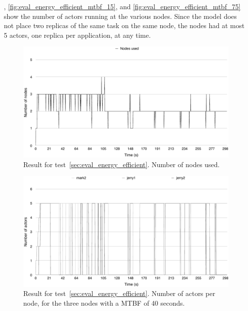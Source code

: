 \documentclass{cslthse-msc}
\begin{document}
, \cref{fig:eval_energy_efficient_mtbf_15}, and \cref{fig:eval_energy_efficient_mtbf_75} show the number of actors running at the various nodes. Since the model does not place two replicas of the same task on the same node, the nodes had at most 5 actors, one replica per application, at any time.

\begin{figure}[!hbt]
\centering
\includegraphics[scale=0.5]{images/results/energy_efficient/total.pdf}
\caption{Result for test~\ref{sec:eval_energy_efficient}. Number of nodes used.} \label{fig:eval_energy_efficient_total}
\end{figure}

\begin{figure}[!hbt]
\centering
\includegraphics[scale=0.5]{images/results/energy_efficient/MTBF_40.pdf}
\caption{Result for test~\ref{sec:eval_energy_efficient}. Number of actors per node, for the three nodes with a MTBF of 40 seconds.} \label{fig:eval_energy_efficient_mtbf_40}
\end{figure}
\end{document}
